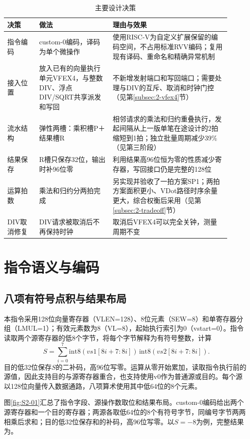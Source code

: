 \begin{table}[!htbp]\centering
\small
\caption{主要设计决策}\label{tab:s2-decisions}
\begin{tabular}{>{\raggedright\arraybackslash}p{0.13\linewidth}>{\raggedright\arraybackslash}p{0.30\linewidth}>{\raggedright\arraybackslash}p{0.48\linewidth}}
\toprule
决策 & 做法 & 理由与效果\\
\midrule
指令编码 & custom-0编码，译码为单个微操作 & 使用RISC-V为自定义扩展保留的编码空间，不占用标准RVV编码；复用现有译码、重命名和精确异常机制\\
接入位置 & 放入已有的向量执行单元VFEX4，与整数DIV、浮点DIV/SQRT共享派发和写回 & 不新增发射端口和写回端口；需要处理与DIV的互斥、取消和时钟门控（见第\ref{subsec:2-vfex4}节）\\
流水结构 & 弹性两槽：乘积槽P＋结果槽R & 相邻请求的乘法和归约重叠执行，发起间隔从上一版单笔在途设计的2拍缩短到1拍；独立批量周期减少39\%（见第三阶段）\\
结果保存 & R槽只保存32位，输出时补96位零 & 利用结果高96位恒为零的性质减少寄存器，写回接口仍是完整的128位\\
运算拍数 & 乘法和归约分两拍完成 & 另实现并验收了一拍方案SP1；两拍方案面积更小、VDot路径时序余量更大，综合权衡后采用（见第\ref{subsec:2-tradeoff}节）\\
DIV取消修复 & DIV请求被取消后不再保持时钟 & 取消后VFEX4可以完全关钟，测量周期不变\\
\bottomrule
\end{tabular}
\end{table}

\section{指令语义与编码}
\subsection{八项有符号点积与结果布局}
本指令采用128位向量寄存器（VLEN=128）、8位元素（SEW=8）和单寄存器分组（LMUL=1）；有效元素数为8（VL=8），起始执行索引为0（vstart=0）。指令读取两个源寄存器的低8个字节，将每个字节解释为有符号整数，计算
\[
S=\sum_{i=0}^{7}\mathrm{int8}(vs1[8i+7:8i])\,
                    \mathrm{int8}(vs2[8i+7:8i]).
\]
目的低32位保存$S$的二补码，高96位写零。运算从零开始累加，读取指令执行前的源值，因此支持目的与源寄存器重合，也支持使用v0作为普通源或目的。每个源以128位向量传入数据通路，八项算术使用其中低64位的8个元素。

图\ref{fig:S2-01}汇总了指令字段、源操作数取位和结果布局。custom-0编码给出两个源寄存器和一个目的寄存器；两源各取低64位的8个有符号字节，同编号字节两两相乘后求和；目的低32位保存和的补码，高96位写零。以$S=-8$为例，完整结果为。

